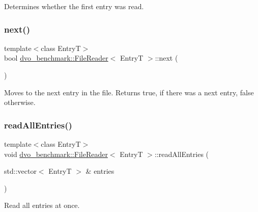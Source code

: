 Determines whether the first entry was read. \mbox{\label{classdvo__benchmark_1_1_file_reader_a47866d6c871158248f3521bf496084e6}} 
\subsubsection{\texorpdfstring{next()}{next()}}
{\footnotesize\ttfamily template$<$class EntryT$>$ \\
bool \mbox{\hyperlink{classdvo__benchmark_1_1_file_reader}{dvo\+\_\+benchmark\+::\+File\+Reader}}$<$ EntryT $>$\+::next (\begin{DoxyParamCaption}{ }\end{DoxyParamCaption})\hspace{0.3cm}{\ttfamily [inline]}}

Moves to the next entry in the file. Returns true, if there was a next entry, false otherwise. \mbox{\label{classdvo__benchmark_1_1_file_reader_a886900b867b838cbf964bdd8daebb772}} 
\subsubsection{\texorpdfstring{read\+All\+Entries()}{readAllEntries()}}
{\footnotesize\ttfamily template$<$class EntryT$>$ \\
void \mbox{\hyperlink{classdvo__benchmark_1_1_file_reader}{dvo\+\_\+benchmark\+::\+File\+Reader}}$<$ EntryT $>$\+::read\+All\+Entries (\begin{DoxyParamCaption}\item[{std\+::vector$<$ EntryT $>$ \&}]{entries }\end{DoxyParamCaption})\hspace{0.3cm}{\ttfamily [inline]}}

Read all entries at once. \mbox{\label{classdvo__benchmark_1_1_file_reader_a2f62b338f1a1b8ffd47091e769c03f8b}} 

